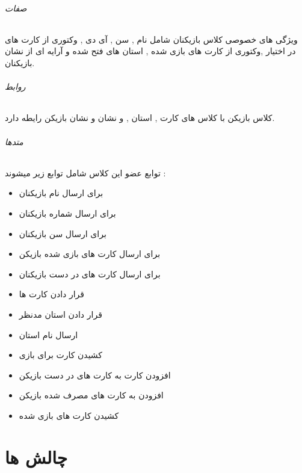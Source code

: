 \documentclass[pdf,titlepage,a4paper]{report}
\begin{document}
	\paragraph{صفات}
	ویژگی های خصوصی کلاس بازیکنان شامل نام , سن , آی دی , وکتوری از کارت های در اختیار ,وکتوری از کارت های بازی شده , استان های فتح شده و آرایه ای از نشان بازیکنان.
	\paragraph{روابط}
	کلاس بازیکن با کلاس های کارت , استان , و نشان و نشان بازیکن رایطه دارد.\\
	
	\paragraph{متدها}
	توابع عضو این کلاس شامل توابع زیر میشوند :
	
	\begin{itemize}
		\item {} برای ارسال نام بازیکنان
		\item {} برای ارسال شماره بازیکنان
		\item {}  برای ارسال سن بازیکنان
		\item {} برای ارسال کارت های بازی شده بازیکن
		\item {} برای ارسال کارت های در دست بازیکنان
		\item {} قرار دادن کارت ها
		\item {} قرار دادن استان مدنظر
		\item {} ارسال نام استان
		\item {} کشیدن کارت برای بازی 
		\item {} افزودن کارت به کارت های در دست بازیکن
		\item {} افزودن به کارت های مصرف شده بازیکن
		\item {} کشیدن کارت های بازی شده
	\end{itemize}
	
	\newpage
	
	
	
	\part{چالش ها}
	
\end{document}
